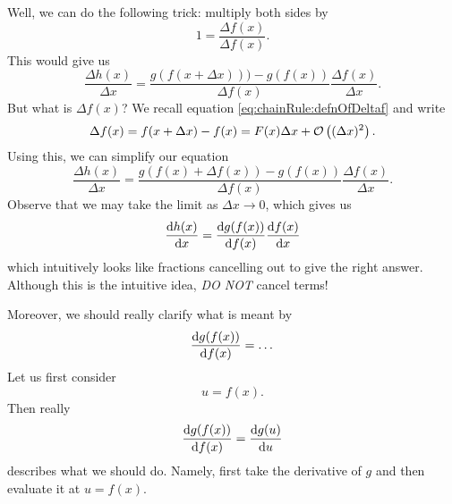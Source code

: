 
Well, we can do the following trick: multiply both sides by
\begin{equation}
1=\frac{\Delta f(x)}{\Delta f(x)}.
\end{equation}
This would give us
\begin{equation}
\frac{\Delta h(x)}{\Delta x}=\frac{g\left(f(x+\Delta x)\right))-g\left(f(x)\right)}{\Delta f(x)}
\frac{\Delta f(x)}{\Delta x}.
\end{equation}
But what is $\Delta f(x)$? We recall equation \eqref{eq:chainRule:defnOfDeltaf}
and write
\begin{equation}
\Delta f(x) = f(x+\Delta x)-f(x)=F(x)\Delta x +\mathcal{O}\left((\Delta x)^{2}\right).
\end{equation}
Using this, we can simplify our equation
\begin{equation}
\frac{\Delta h(x)}{\Delta x}=\frac{g(f(x)+\Delta f(x))-g(f(x))}{\Delta f(x)}
\frac{\Delta f(x)}{\Delta x}.
\end{equation}
Observe that we may take the limit as $\Delta x\to0$, which gives
us
\begin{equation}
\frac{\mathrm{d} h(x)}{\mathrm{d} x}=\frac{\mathrm{d} g(f(x))}{\mathrm{d} f(x)}\frac{\mathrm{d} f(x)}{\mathrm{d} x}
\end{equation}
which intuitively looks like fractions cancelling out to give the
right answer. Although this is the intuitive idea, \emph{DO NOT}
cancel terms!

Moreover, we should really clarify what is meant by
\begin{equation}
\frac{\mathrm{d} g(f(x))}{\mathrm{d} f(x)}=\dots
\end{equation}
Let us first consider
\begin{equation}
u=f(x).
\end{equation}
Then really
\begin{equation}
\frac{\mathrm{d} g(f(x))}{\mathrm{d} f(x)}=\frac{\mathrm{d} g(u)}{\mathrm{d} u}
\end{equation}
describes what we should do. Namely, first take the derivative of
$g$ and then evaluate it at $u=f(x)$.

